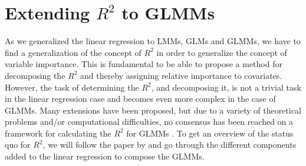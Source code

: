 








\section{Extending $R^2$ to GLMMs}
\label{sec:R2_GLMM}
As we generalized the linear regression to LMMs, GLMs and GLMMs, we have to find a generalization of the concept of $R^2$ in order to generalize the concept of variable importance. This is fundamental to be able to propose a method for decomposing the $R^2$ and thereby assigning relative importance to covariates.
However, the task of determining the $R^2$, and decomposing it, is not a trivial task in the linear regression case and becomes even more complex in the case of GLMMs.
Many extensions have been proposed, but due to a variety of theoretical problems and/or computational difficulties, no consensus has been reached on a framework for calculating the $R^2$ for GLMMs \citep{nakagawa2013general}.
To get an overview of the status quo for $R^2$, we will follow the paper by \citet{nakagawa2013general} and go through the different components added to the linear regression to compose the GLMMs.
